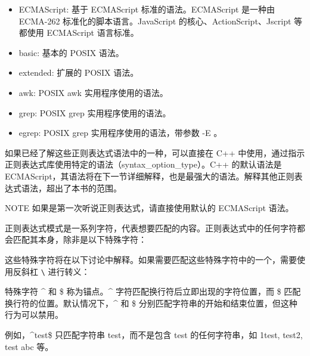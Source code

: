 \begin{itemize}
\item
ECMAScript: 基于 ECMAScript 标准的语法。ECMAScript 是一种由 ECMA-262 标准化的脚本语言。JavaScript 的核心、ActionScript、Jscript 等都使用 ECMAScript 语言标准。

\item
basic: 基本的 POSIX 语法。

\item
extended: 扩展的 POSIX 语法。

\item
awk: POSIX awk 实用程序使用的语法。

\item
grep: POSIX grep 实用程序使用的语法。

\item
egrep: POSIX grep 实用程序使用的语法，带参数 -E 。
\end{itemize}

如果已经了解这些正则表达式语法中的一种，可以直接在 C++ 中使用，通过指示正则表达式库使用特定的语法（syntax\_option\_type）。C++ 的默认语法是 ECMAScript，其语法将在下一节详细解释，也是最强大的语法。解释其他正则表达式语法，超出了本书的范围。

\begin{myNotic}{NOTE}
如果是第一次听说正则表达式，请直接使用默认的 ECMAScript 语法。
\end{myNotic}


正则表达式模式是一系列字符，代表想要匹配的内容。正则表达式中的任何字符都会匹配其本身，除非是以下特殊字符：


这些特殊字符将在以下讨论中解释。如果需要匹配这些特殊字符中的一个，需要使用反斜杠 \verb|\| 进行转义：



特殊字符 \^{} 和 \$ 称为锚点。\^{} 字符匹配换行符后立即出现的字符位置，而 \$ 匹配换行符的位置。默认情况下，\^{} 和 \$ 分别匹配字符串的开始和结束位置，但这种行为可以禁用。

例如，\^{}test\$ 只匹配字符串 test，而不是包含 test 的任何字符串，如 1test, test2, test abc 等。

